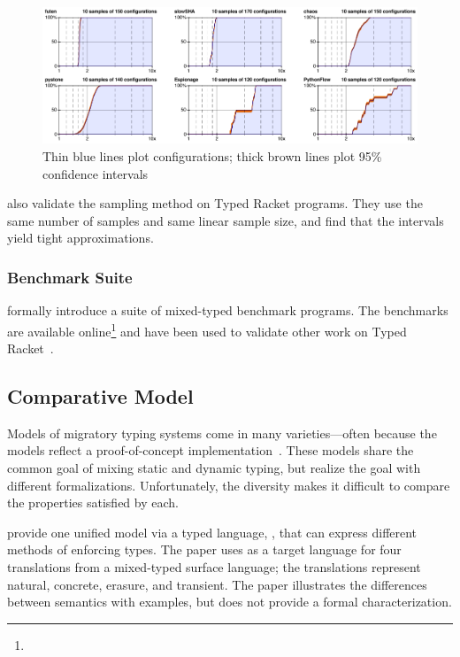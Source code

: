 \begin{figure}[h]
  \includegraphics[width=\columnwidth]{src/sampling.png}
  \caption{Thin blue lines plot  configurations; thick brown lines plot 95\% confidence intervals}
  \label{fig:sampling}
\end{figure}

\citet{gtnffvf-jfp-2019} also validate the sampling method on Typed Racket
 programs.
They use the same number of samples and same linear sample size, and find
 that the intervals yield tight approximations.



\subsubsection{Benchmark Suite}

\citet{gtnffvf-jfp-2019} formally introduce a suite of mixed-typed benchmark
 programs.
The benchmarks are available online\footnote{}
 and have been used to validate other work on Typed Racket~\cite{gf-icfp-2018,bbst-oopsla-2017}.


\subsection{Comparative Model}

Models of migratory typing systems come in many varieties---often because
 the models reflect a proof-of-concept implementation~\cite{bat-ecoop-2014,wnlov-popl-2010,mt-oopsla-2017,vss-popl-2017,tf-popl-2008}.
These models share the common goal of mixing static and dynamic typing,
 but realize the goal with different formalizations.
Unfortunately, the diversity makes it difficult to compare the
 properties satisfied by each.

\citet{clzv-ecoop-2018} provide one unified model via a typed language,
 \kafka{}, that can express different methods of enforcing types.
The paper uses \kafka{} as a target language for four translations from
 a mixed-typed surface language; the translations represent natural,
 concrete, erasure, and transient.
The paper illustrates the differences between semantics with examples,
 but does not provide a formal characterization.

